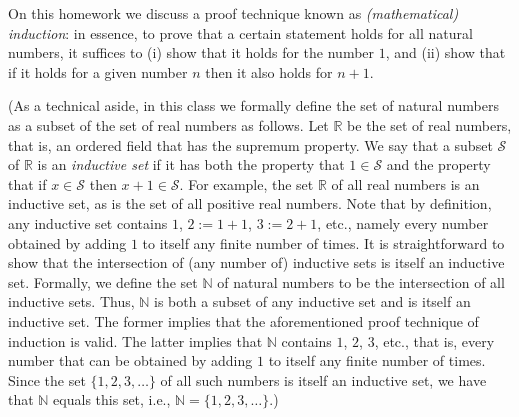 \documentclass[12 pt,letterpaper]{article}
\newcommand{\bbN}{\mathbb{N}}
\newcommand{\bbR}{\mathbb{R}}
\newcommand{\calS}{\mathcal{S}}
\newcommand{\set}[1]{\{{#1}\}}
\begin{document}
\noindent
On this homework we discuss a proof technique known as \textit{(mathematical) induction}:
in essence,
to prove that a certain statement holds for all natural numbers,
it suffices to (i) show that it holds for the number $1$, and (ii) show that if it holds for a given number $n$ then it also holds for $n+1$.

(As a technical aside,
in this class we formally define the set of natural numbers as a subset of the set of real numbers as follows.
Let $\bbR$ be the set of real numbers, that is, an ordered field that has the supremum property.
We say that a subset $\calS$ of $\bbR$ is an \textit{inductive set} if it has both the property that $1\in\calS$ and the property that if $x\in\calS$ then $x+1\in\calS$.
For example, the set $\bbR$ of all real numbers is an inductive set,
as is the set of all positive real numbers.
Note that by definition, any inductive set contains $1$, $2:=1+1$, $3:=2+1$, etc., namely every number obtained by adding $1$ to itself any finite number of times.
It is straightforward to show that the intersection of (any number of) inductive sets is itself an inductive set.
Formally, we define the set $\bbN$ of natural numbers to be the intersection of all inductive sets.
Thus, $\bbN$ is both a subset of any inductive set and is itself an inductive set.
The former implies that the aforementioned proof technique of induction is valid.
The latter implies that $\bbN$ contains $1$, $2$, $3$, etc., that is, every number that can be obtained by adding $1$ to itself any finite number of times.
Since the set $\set{1,2,3,\dotsc}$ of all such numbers is itself an inductive set,
we have that $\bbN$ equals this set, i.e., $\bbN=\set{1,2,3,\dotsc}$.)
\end{document}
